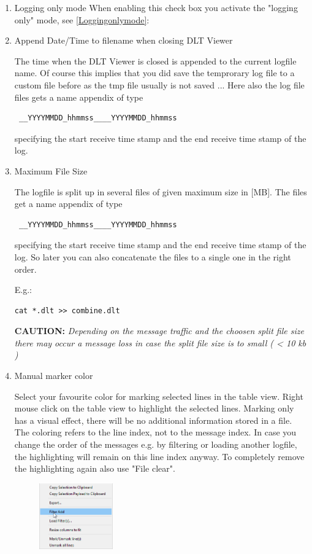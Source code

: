 \documentclass[a4paper,11pt]{article}
\newcommand{\caution}[1]{\begin{ibox} \textbf{CAUTION:} \emph{#1} \end{ibox}}
\begin{document}
\begin{enumerate}
\item{Logging only mode}
\label{enableloggingonlymode}
When enabling this check box you activate the "logging only" mode, see \autoref{Loggingonlymode}:

\item{Append Date/Time to filename when closing DLT Viewer}

The time when the DLT Viewer is closed is appended to the current logfile name.
Of course this implies that you did save the temprorary log file to a custom file before as the tmp file
usually is not saved ...
Here also the log file files gets a name appendix of type \begin{verbatim} __YYYYMMDD_hhmmss____YYYYMMDD_hhmmss \end{verbatim} specifying the start receive time stamp and the end receive time stamp of the log.


\item{Maximum File Size}

The logfile is split up in several files of given maximum size in [MB].
The files get a name appendix of type \begin{verbatim} __YYYYMMDD_hhmmss____YYYYMMDD_hhmmss \end{verbatim} specifying the start receive time stamp
and the end receive time stamp of the log.
So later you can also concatenate the files to a single one in the right order.

E.g.:
\begin{verbatim}
cat *.dlt >> combine.dlt
\end{verbatim}

\caution{Depending on the message traffic and the choosen split file size there may occur a message loss in case the split file size is to small ( < 10 kb )}

\item{Manual marker color}

Select your favourite color for marking selected lines in the table view.
Right mouse click on the table view to highlight the selected lines. Marking only has a visual effect, 
there will be no additional information stored in a file. The coloring refers to the line index, not to the message index. In case you
change the order of the messages e.g. by filtering or loading another logfile, the highlighting will remain on this line index anyway.
To completely remove the highlighting again also use "File clear".

\begin{figure}[H]
 \centering
 \includegraphics[width=0.3\textwidth]{images/rightmouse_tableview.png}
\end{figure}

\end{enumerate}
\end{document}
